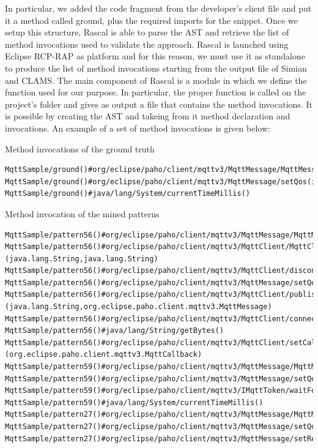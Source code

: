 In particular, we added the code fragment from the developer's client file and put it a method called ground, plus the required imports for the snippet. Once we setup this structure, Rascal is able to parse the AST and retrieve the list of method invocations used to validate the approach. Rascal is launched using Eclipse RCP-RAP as platform and for this reason, we must use it as standalone to produce the list of method invocations starting from the output file of Simian and CLAMS. The main component of Rascal is a module in which we define the function used for our purpose. In particular, the proper function is called on the project's folder and gives as output a file that contains the method invocations. It is possible by creating the AST and takeing from it method declaration and invocations. An example of a set of method invocations is given below:%


Method invocations of the ground truth

\begin{lstlisting}
MqttSample/ground()#org/eclipse/paho/client/mqttv3/MqttMessage/MqttMessage(byte[])
MqttSample/ground()#org/eclipse/paho/client/mqttv3/MqttMessage/setQos(int)
MqttSample/ground()#java/lang/System/currentTimeMillis()
\end{lstlisting}

\vspace{5mm}
\noindent
Method invocation of the mined patterns
\begin{lstlisting}
MqttSample/pattern56()#org/eclipse/paho/client/mqttv3/MqttMessage/MqttMessage(byte[])
MqttSample/pattern56()#org/eclipse/paho/client/mqttv3/MqttClient/MqttClient
(java.lang.String,java.lang.String)
MqttSample/pattern56()#org/eclipse/paho/client/mqttv3/MqttClient/disconnect()
MqttSample/pattern56()#org/eclipse/paho/client/mqttv3/MqttMessage/setQos(int)
MqttSample/pattern56()#org/eclipse/paho/client/mqttv3/MqttClient/publish
(java.lang.String,org.eclipse.paho.client.mqttv3.MqttMessage)
MqttSample/pattern56()#org/eclipse/paho/client/mqttv3/MqttClient/connect()
MqttSample/pattern56()#java/lang/String/getBytes()
MqttSample/pattern56()#org/eclipse/paho/client/mqttv3/MqttClient/setCallback
(org.eclipse.paho.client.mqttv3.MqttCallback)
MqttSample/pattern59()#org/eclipse/paho/client/mqttv3/MqttMessage/MqttMessage(byte[])
MqttSample/pattern59()#org/eclipse/paho/client/mqttv3/MqttMessage/setQos(int)
MqttSample/pattern59()#org/eclipse/paho/client/mqttv3/IMqttToken/waitForCompletion()
MqttSample/pattern59()#java/lang/System/currentTimeMillis()
MqttSample/pattern27()#org/eclipse/paho/client/mqttv3/MqttMessage/MqttMessage(byte[])
MqttSample/pattern27()#org/eclipse/paho/client/mqttv3/MqttMessage/setQos(int)
MqttSample/pattern27()#org/eclipse/paho/client/mqttv3/MqttMessage/setRetained(boolean)

\end{lstlisting}

